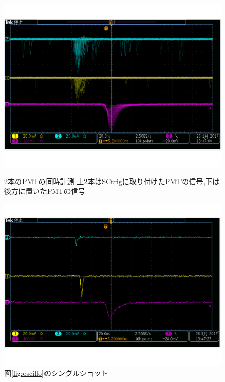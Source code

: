 \begin{figure}[]
\begin{minipage}{0.5\hsize}
\centering
\includegraphics[keepaspectratio,scale=0.3]{fig/ybm/oscillo.pdf}
\caption{2本のPMTの同時計測\newline
上2本はSCtrigに取り付けたPMTの信号,下は後方に置いたPMTの信号}
\label{fig:oscillo}
\end{minipage}
\begin{minipage}{0.5\hsize}
\centering
\includegraphics[keepaspectratio,scale=0.3]{fig/ybm/oscillo1.pdf}
\caption{図\ref{fig:oscillo}のシングルショット}
\label{fig:oscillo1}
\end{minipage}
\end{figure}

